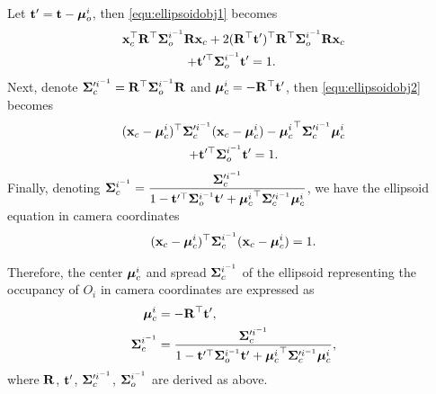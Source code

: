 \documentclass[10pt,twocolumn,letterpaper]{article}
\begin{document}
Let $\mathbf{t}' = \mathbf{t} - {\bm{\mu}}^{i}_o$, then \eqref{equ:ellipsoidobj1} becomes
\begin{multline}
  \mathbf{x}_c^\top \mathbf{R}^\top \bm{\Sigma}^{i^{-1}}_o \mathbf{R} \mathbf{x}_c + 2 (\mathbf{R}^\top \mathbf{t}')^\top  \mathbf{R}^\top\bm{\Sigma}^{i^{-1}}_o \mathbf{R} \mathbf{x}_c
  \\
  + \mathbf{t}'^\top \bm{\Sigma}^{i^{-1}}_o \mathbf{t}' = 1.
\
\label{equ:ellipsoidobj2}
\end{multline}
Next, denote $\bm{\Sigma}'^{i^{-1}}_c = \mathbf{R}^\top \bm{\Sigma}^{i^{-1}}_o \mathbf{R}$ and ${{\bm{\mu}}^{i}_c} = - \mathbf{R}^\top
\mathbf{t}'$, then \eqref{equ:ellipsoidobj2} becomes
\begin{multline}
  (\mathbf{x}_c - {{\bm{\mu}}^{i}_c})^\top\bm{\Sigma}'^{i^{-1}}_c(\mathbf{x}_c - {{\bm{\mu}}^{i}_c}) - {{\bm{\mu}}^{i}_c}^\top\bm{\Sigma}'^{i^{-1}}_c{{\bm{\mu}}^{i}_c} 
  \\
  + \mathbf{t}'^\top \bm{\Sigma}^{i^{-1}}_o \mathbf{t}' = 1.
\end{multline}
Finally, denoting $\bm{\Sigma}^{i^{-1}}_c = \displaystyle\frac{\bm{\Sigma}'^{i^{-1}}_c}{1 - \mathbf{t}'^\top \bm{\Sigma}^{i^{-1}}_o \mathbf{t}' +
{{\bm{\mu}}^{i}_c}^\top\bm{\Sigma}'^{i^{-1}}_c{{\bm{\mu}}^{i}_c}}$, we have the ellipsoid equation in camera coordinates
\begin{align}
(\mathbf{x}_c - {{\bm{\mu}}^{i}_c})^\top\bm{\Sigma}^{i^{-1}}_c(\mathbf{x}_c - {{\bm{\mu}}^{i}_c}) = 1.
\label{equ:ellipsoidcam}
\end{align}

Therefore, the center ${{\bm{\mu}}^{i}_c}$ and spread $\bm{\Sigma}^{i^{-1}}_c$ of the ellipsoid representing the occupancy of $O_i$ in camera coordinates are expressed as
\begin{align}
  \label{eq:ellipsoidMeanSigma}
  {{\bm{\mu}}^{i}_c} &= - \mathbf{R}^\top \mathbf{t}', \\
  \bm{\Sigma}^{i^{-1}}_c &= \frac{\bm{\Sigma}'^{i^{-1}}_c}
{1 - \mathbf{t}'^\top \bm{\Sigma}^{i^{-1}}_o \mathbf{t}' + {{\bm{\mu}}^{i}_c}^\top\bm{\Sigma}'^{i^{-1}}_c{{\bm{\mu}}^{i}_c}},
\end{align}
where $\mathbf{R}$, $\mathbf{t}'$, $\bm{\Sigma}'^{i^{-1}}_c$, $\bm{\Sigma}^{i^{-1}}_o$ are derived as above.
\end{document}
